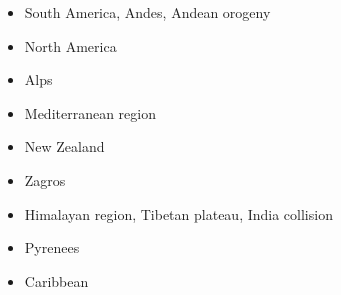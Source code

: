 \begin{itemize}
\item South America, Andes, Andean orogeny 
\cite{wdbo94b}
\cite{gusb00}
\cite{baso05}\cite{soba05}
\cite{basv06}
\cite{hucf12}\cite{shlm12}
\cite{robn16}
\cite{yamg19}
\item North America 
\cite{huha90}
\cite{bugm97}
\cite{besb06}
\cite{splg08}
\cite{splg09}
\cite{ghbh13}
\item Alps 
\cite{pfsb02}
\cite{pimo03}
\cite{buge05}
\cite{vifj08}
\cite{luws13}
\cite{scdu15}
\item Mediterranean region 
\cite{pimo97}
\cite{pimo03}
\cite{bofb10}\cite{fabe10}
\cite{chsv14}\cite{chsg14}\cite{vavs14}
\cite{spcv18}
\item {New Zealand} 
\cite{koon90}
\cite{brbe95}
\cite{bekh96}
\cite{babr99}
\cite{gedh02}\cite{pybf02}
\cite{gehd03}\cite{konc03}\cite{upke03}
\cite{libi06}
\cite{pyeg10}\cite{spgs10a}
\cite{grel12}
\item {Zagros}
\cite{vech06}
\cite{hamo10}
\cite{yakm11}
\cite{nipc13}
\cite{frba14}
\cite{ghbu14}
\cite{coyc16}
\cite{rugb17}
\item {Himalayan region, Tibetan plateau, India collision} 
\cite{bird78}
\cite{tapl82}\cite{vidm82}
\cite{vidm84}
\cite{vimd86}
\cite{peta88}
\cite{moln89}
\cite{moem93}
\cite{wibe94}
\cite{chmm95}\cite{leka95}
\cite{robk97}
\cite{vasb99}
\cite{cblk00}\cite{clro00}
\cite{bejn01}\cite{laav01}\cite{zemk01}\cite{tazr01}
\cite{kozc02}
\cite{reta03}
\cite{bejn04}
\cite{clbr05}\cite{rost05a}\cite{rost05b}
\cite{clrw06}
\cite{busc08}
\cite{hamo10}
\cite{befa11}\cite{zhxy11}\cite{vasd11}
\cite{zams12}\cite{vald12}
\cite{care13}\cite{mutg13}\cite{chgz13}\cite{chgz13b}
\cite{whbb14}
\cite{bube17}
\cite{pirf18}
\cite{sccs19}\cite{scvm19}
\item {Pyrenees} 
\cite{giju98}
\cite{bemh00}
\cite{mcmg04}
\cite{jaml10}
\cite{vime12}
\cite{fihv13b}
\cite{dual19}
\item{Caribbean} 
\cite{vago10}
\cite{vags13}

\end{itemize}
